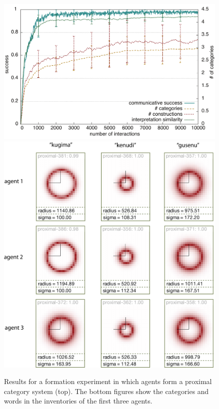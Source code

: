 \begin{figure}
\begin{center}
\includegraphics[width=0.8\columnwidth]{figs/category-formation-proximal-results+categories-1}
\includegraphics[width=0.8\columnwidth]{figs/category-formation-proximal-results+categories-2.png}
\end{center}
\caption[Results formation of proximal category systems]{Results 
for a formation experiment in which agents form
a proximal category system (top). The bottom figures show the categories and words
in the inventories of the first three agents.}
\label{f:category-formation-proximal-results}
\end{figure}

